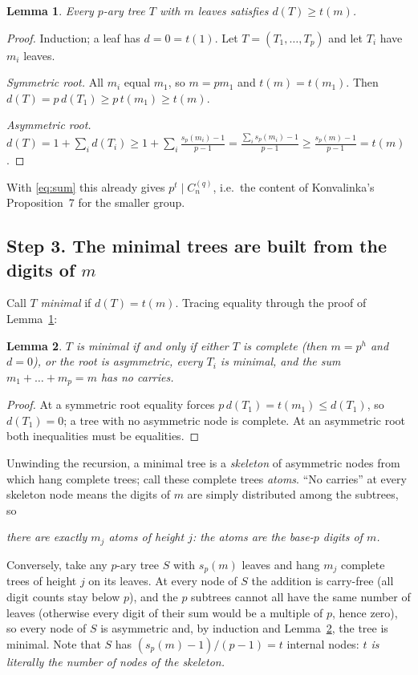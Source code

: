 \documentclass[11pt]{article}
\newtheorem{lemma}{Lemma}
\theoremstyle{definition}
\newcommand{\sd}{s_p}
\newcommand{\C}[1]{C^{(q)}_{#1}}
\begin{document}
\begin{lemma}\label{lem:lower}
Every $p$-ary tree $T$ with $m$ leaves satisfies $d(T)\ge t(m)$.
\end{lemma}
\begin{proof}
Induction; a leaf has $d=0=t(1)$. Let $T=(T_1,\dots,T_p)$ and let $T_i$ have $m_i$ leaves.

\emph{Symmetric root.} All $m_i$ equal $m_1$, so $m=pm_1$ and $t(m)=t(m_1)$. Then
$d(T)=p\,d(T_1)\ge p\,t(m_1)\ge t(m)$.

\emph{Asymmetric root.}
$d(T)=1+\sum_i d(T_i)\ge 1+\sum_i\frac{\sd(m_i)-1}{p-1}
=\frac{\sum_i \sd(m_i)-1}{p-1}\ge\frac{\sd(m)-1}{p-1}=t(m)$.
\end{proof}

With \eqref{eq:sum} this already gives $p^t\mid\C{n}$, i.e.\ the content of Konvalinka's
Proposition~7 for the smaller group.

\subsection*{Step 3. The minimal trees are built from the digits of $m$}

Call $T$ \emph{minimal} if $d(T)=t(m)$. Tracing equality through the proof of
Lemma~\ref{lem:lower}:

\begin{lemma}\label{lem:min}
$T$ is minimal if and only if either $T$ is complete (then $m=p^h$ and $d=0$), or the root
is asymmetric, every $T_i$ is minimal, and the sum $m_1+\dots+m_p=m$ has no carries.
\end{lemma}
\begin{proof}
At a symmetric root equality forces $p\,d(T_1)=t(m_1)\le d(T_1)$, so $d(T_1)=0$; a tree with
no asymmetric node is complete. At an asymmetric root both inequalities must be equalities.
\end{proof}

Unwinding the recursion, a minimal tree is a \emph{skeleton} of asymmetric nodes from which
hang complete trees; call these complete trees \emph{atoms}. ``No carries'' at every skeleton
node means the digits of $m$ are simply distributed among the subtrees, so
\begin{center}
\emph{there are exactly $m_j$ atoms of height $j$: the atoms are the base-$p$ digits of $m$.}
\end{center}
Conversely, take any $p$-ary tree $S$ with $\sd(m)$ leaves and hang $m_j$ complete trees of
height $j$ on its leaves. At every node of $S$ the addition is carry-free (all digit counts
stay below $p$), and the $p$ subtrees cannot all have the same number of leaves (otherwise
every digit of their sum would be a multiple of $p$, hence zero), so every node of $S$ is
asymmetric and, by induction and Lemma~\ref{lem:min}, the tree is minimal. Note that $S$ has $(\sd(m)-1)/(p-1)=t$ internal
nodes: \emph{$t$ is literally the number of nodes of the skeleton.}
\end{document}
